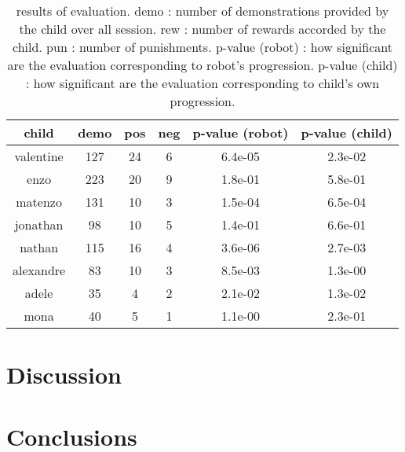 \documentclass{sig-alternate}
\begin{document}
\begin{table}
    \centering
    \begin{tabular}{|c|c|c|c|c|c|}
        \hline
        child & demo & pos & neg & p-value (robot) & p-value (child)\\ \hline
        valentine & 127 & 24 & 6 & 6.4e-05 & 2.3e-02\\ \hline
        enzo & 223 & 20 & 9 & 1.8e-01 & 5.8e-01\\ \hline
        matenzo & 131 & 10 & 3 & 1.5e-04 & 6.5e-04\\ \hline
        jonathan & 98 & 10 & 5 &  1.4e-01 & 6.6e-01\\ \hline
        nathan & 115 & 16 & 4 & 3.6e-06 & 2.7e-03\\ \hline
        alexandre & 83 & 10 & 3 & 8.5e-03 & 1.3e-00\\ \hline
        adele & 35 & 4 & 2 & 2.1e-02 & 1.3e-02\\ \hline
        mona & 40 & 5 & 1 &  1.1e-00 & 2.3e-01\\ \hline
    \end{tabular}
    \caption{results of evaluation. demo : number of demonstrations provided by
        the child over all session. rew : number of rewards accorded by
        the child. pun : number of punishments. p-value (robot) : how
        significant are the evaluation corresponding to robot's progression. p-value
    (child) : how significant are the evaluation corresponding to child's own progression.}
    \label{table:scores}
\end{table}


\section{Discussion}

\section{Conclusions}


 
\end{document}
